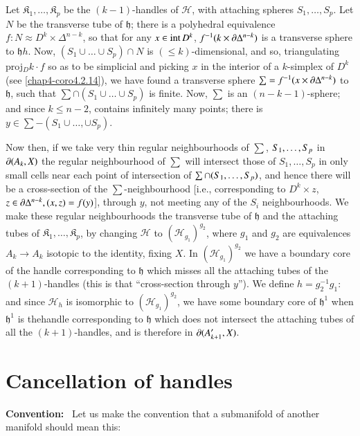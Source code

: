 Let $\mathfrak{K}_{1},\ldots,\mathfrak{K}_{p}$ be the $(k-1)$-handles of $\mathscr{H}$, with attaching spheres $S_{1},\ldots,S_{p}$. Let $N$ be the transverse tube of $\mathfrak{h}$; there is a polyhedral equivalence $f:N\approx D^{k}\times \Delta^{n-k}$, so that for any $x\in \text{int\,}D^{k}$, $f^{-1}(k\times \partial \Delta^{n-k})$ is a transverse sphere to $\mathfrak{h}h$. Now, $(S_{1}\cup\ldots\cup S_{p})\cap N$ is $(\leq k)$-dimensional, and so, triangulating proj$_{D}k\cdot f$ so as to be simplicial and picking $x$ in the interior of a $k$-simplex of $D^{k}$ (see  \ref{chap4-coro4.2.14}), we have found a transverse sphere $\sum =f^{-1}(x\times \partial \Delta^{n-k})$ to $\mathfrak{h}$, such that $\sum \cap (S_{1}\cup \ldots \cup S_{p})$ is finite. Now, $\sum$ is an $(n-k-1)$-sphere; and since $k\leq n-2$, contains infinitely many points; there is $y\in \sum-(S_{1}\cup\ldots,\cup S_{p})$. 

Now then, if we take very thin regular neighbourhoods of $\sum$, $S_{1},\break\ldots,S_{p}$ in $\partial (A_{k},X)$ the regular neighbourhood of $\sum$ will intersect those of $S_{1},\ldots,S_{p}$ in only small cells near each point of intersection of $\sum \cap (S_{1},\break\ldots,S_{p})$, and hence there will be a cross-section of the $\sum$-neighbourhood [i.e., corresponding to $D^{k}\times z$, $z\in \partial \Delta^{n-k},(x,z)=f(y)$], through $y$, not meeting any of the $S_{i}$ neighbourhoods. We make these regular neighbourhoods the transverse tube of $\mathfrak{h}$ and the attaching tubes of $\mathfrak{K}_{1},\ldots,\mathfrak{K}_{p}$, by changing $\mathscr{H}$ to $(\mathscr{H}_{g_{1}})^{g_{2}}$, where $g_{1}$ and $g_{2}$ are equivalences $A_{k}\to A_{k}$ isotopic to the identity, fixing $X$. In $(\mathscr{H}_{g_{1}})^{g_{2}}$ we have a boundary core of the handle corresponding to $\mathfrak{h}$ which misses all the attaching tubes of the $(k+1)$-handles (this is that ``cross-section through $y$''). We define $h=g_{2}^{-1}g_{1}$: and since $\mathscr{H}_{h}$ is isomorphic to $(\mathscr{H}_{g_{1}})^{g_{2}}$, we have some boundary core of $\mathfrak{h}^1$ when $\mathfrak{h}^1$ is the\pageoriginale handle corresponding to $\mathfrak{h}$ which does not intersect the attaching tubes of all the $(k+1)$-handles, and is therefore in $\partial (A'_{k+1},X)$.

\section{Cancellation of handles}\label{chap8-sec8.5}

\noindent
{\bf Convention:}~ Let us make the convention that a submanifold of another manifold should mean this:

